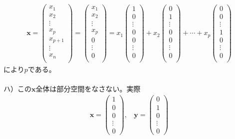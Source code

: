 \documentclass[dvipdfmx,uplatex,11pt]{jsarticle}
\begin{document}
\begin{eqnarray*}
\bm{x}=
\begin{pmatrix}
x_1 \\
x_2 \\
\vdots \\
x_{p} \\
x_{p+1} \\
\vdots \\
x_n \\
\end{pmatrix}
=
\begin{pmatrix}
x_1 \\
x_2 \\
\vdots \\
x_{p} \\
0 \\
\vdots \\
0 \\
\end{pmatrix}
=x_1
\begin{pmatrix}
1 \\
0 \\
\vdots \\
0 \\
0 \\
\vdots \\
0 \\
\end{pmatrix}
+x_2
\begin{pmatrix}
0 \\
1 \\
\vdots \\
0 \\
0 \\
\vdots \\
0 \\
\end{pmatrix}
+\cdots +x_p
\begin{pmatrix}
0 \\
0 \\
\vdots \\
1 \\
0 \\
\vdots \\
0 \\
\end{pmatrix}
\end{eqnarray*}
により$p$である。\\
\dotfill \\
ハ）この$\bm{x}全体$は部分空間をなさない。実際
\begin{eqnarray*}
\bm{x}=
\begin{pmatrix}
1 \\
0 \\
0 \\
\vdots \\
0
\end{pmatrix}
,~~~~
\bm{y}=
\begin{pmatrix}
0 \\
1 \\
0 \\
\vdots \\
0
\end{pmatrix}
\end{eqnarray*}
\end{document}
